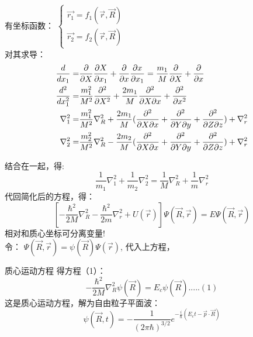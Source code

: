 	有坐标函数：
	$\displaystyle \begin{cases}
		\vec{r_1}= f_1(\vec{r},\vec{R}) \\
		\vec{r_2}= f_2(\vec{r},\vec{R}) 
	\end{cases}$ \\	
	对其求导：
	\begin{equation*}
		\begin{split}
		\dfrac{d}{dx_1}= &\dfrac{\partial}{\partial X}  \dfrac{\partial X}{ \partial x_1} +\dfrac{\partial }{\partial x}  \dfrac{\partial x}{\partial x_1} 
		= \dfrac{m_1}{M}  \dfrac{\partial }{ \partial X} +\dfrac{\partial }{\partial x} \\ \vspace{0.3em}
		\dfrac{d^2}{dx^2 _1}= &\dfrac{m^2 _1}{M^2 }  \dfrac{\partial^2 }{ \partial X^2} + \dfrac{2m _1}{M }  \dfrac{\partial^2 }{ \partial X \partial x}+\dfrac{\partial ^2 }{\partial x^2} \\		
		\nabla ^2 _1= &\dfrac{m^2 _1}{M^2 }  \nabla ^2 _R + \dfrac{2m _1}{M }  (\dfrac{\partial^2 }{ \partial X \partial x} +  \dfrac{\partial^2 }{ \partial Y \partial y} + \dfrac{\partial^2 }{ \partial Z \partial z})    + \nabla ^2 _r  \\
		\nabla ^2 _2= &\dfrac{m^2 _2}{M^2 }  \nabla ^2 _R - \dfrac{2m _2}{M }  (\dfrac{\partial^2 }{ \partial X \partial x} +  \dfrac{\partial^2 }{ \partial Y \partial y} + \dfrac{\partial^2 }{ \partial Z \partial z})    + \nabla ^2 _r
		\end{split}
	\end{equation*}
		


	结合在一起，得:	
	\begin{equation*}
		\dfrac{1}{m_1}\nabla ^2 _1	+ \dfrac{1}{m_2}\nabla ^2 _2 = \dfrac{1}{M}\nabla ^2 _R+ \dfrac{1}{m}\nabla ^2 _r
	\end{equation*}	
	代回简化后的方程，得：
	\begin{equation*}
		\left[-\frac{\hbar^2}{2 M} \nabla_R ^2  -\frac{\hbar^2}{2 m} \nabla_r ^2 +U(\vec{r} ) \right] \Psi (\vec{R},\vec{r}) =E \Psi (\vec{R},\vec{r}) 
	\end{equation*}
	相对和质心坐标可分离变量! \\ 
	令： $\Psi (\vec{R},\vec{r}) = \psi (\vec{R}) \Psi (\vec{r})  $, 代入上方程，
		


	{质心运动方程}
	得方程（1）：
	\begin{equation*}
		-\frac{\hbar^2}{2 M} \nabla_R ^2  \psi (\vec{R}) =E_c \psi (\vec{R})  ..... (1)
	\end{equation*}	
	这是质心运动方程，解为自由粒子平面波：
	\begin{equation*}
	\psi (\vec{R},t)=-\frac{1}{(2\pi\hbar)^{3/2}}e^{-\frac{i}{\hbar}(E_c t -\vec{p}\cdot\vec{R})}
	\end{equation*}
		


